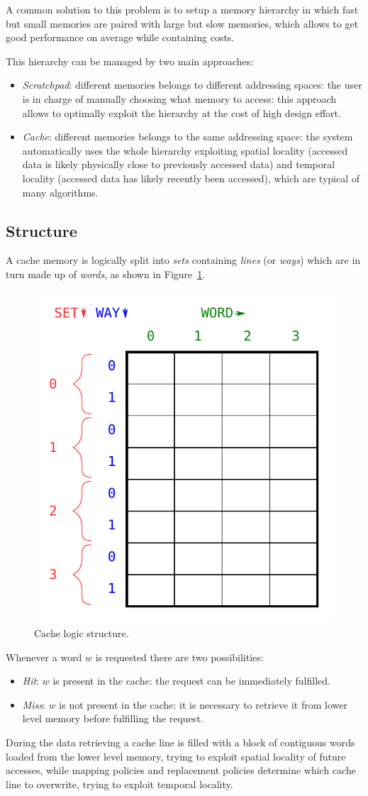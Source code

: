 \documentclass[11pt,a4paper]{memoir}
\begin{document}
A common solution to this problem is to setup a memory hierarchy in
which fast but small memories are paired with large but slow memories, which
allows to get good performance on average while containing costs.

This hierarchy can be managed by two main approaches:
\begin{itemize}
	\item \emph{Scratchpad}: different memories belongs to different addressing
		spaces: the user is in charge of manually choosing what memory
		to access: this approach allows to optimally exploit the
		hierarchy at the cost of high design effort.
	\item \emph{Cache}: different memories belongs to the same addressing
		space: the system automatically uses the whole hierarchy
		exploiting spatial locality (accessed data is likely physically
		close to previously accessed data) and temporal locality
		(accessed data has likely recently been accessed), which are
		typical of many algorithms.
\end{itemize}

\subsection{Structure}
A cache memory is logically split into \emph{sets} containing \emph{lines} (or
\emph{ways}) which are in turn made up of \emph{words}, as shown in
Figure~\ref{fig:cache_logic_structure}.

\begin{figure}
	\centering
	\includegraphics[width=.5\textwidth]{cache_logic_structure}
	\caption{Cache logic structure.}
	\label{fig:cache_logic_structure}
\end{figure}

Whenever a word $w$ is requested there are two possibilities:
\begin{itemize}
	\item \emph{Hit}: $w$ is present in the cache: the request can be
		immediately fulfilled.
	\item \emph{Miss}: $w$ is not present in the cache: it is necessary to
		retrieve it from lower level memory before fulfilling the request.
\end{itemize}
During the data retrieving a cache line is filled with a block of contiguous
words loaded from the lower level memory, trying to exploit spatial locality of
future accesses, while mapping policies and replacement policies determine which
cache line to overwrite, trying to exploit temporal locality.
\end{document}
